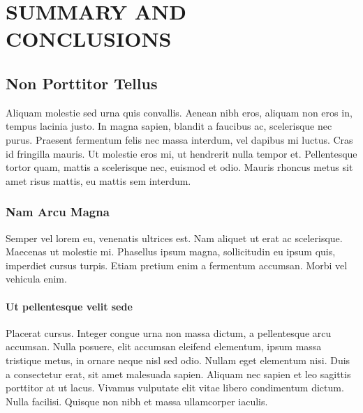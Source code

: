 \chapter{SUMMARY AND CONCLUSIONS} \label{conclusion}

\section{Non Porttitor Tellus}

Aliquam molestie sed urna quis convallis. Aenean nibh eros, aliquam non eros in, tempus lacinia justo. In magna sapien, blandit a faucibus ac, scelerisque nec purus. Praesent fermentum felis nec massa interdum, vel dapibus mi luctus. Cras id fringilla mauris. Ut molestie eros mi, ut hendrerit nulla tempor et. Pellentesque tortor quam, mattis a scelerisque nec, euismod et odio. Mauris rhoncus metus sit amet risus mattis, eu mattis sem interdum.

\subsection{Nam Arcu Magna}
Semper vel lorem eu, venenatis ultrices est. Nam aliquet ut erat ac scelerisque. Maecenas ut molestie mi. Phasellus ipsum magna, sollicitudin eu ipsum quis, imperdiet cursus turpis. Etiam pretium enim a fermentum accumsan. Morbi vel vehicula enim.

\subsubsection{Ut pellentesque velit sede}
 Placerat cursus. Integer congue urna non massa dictum, a pellentesque arcu accumsan. Nulla posuere, elit accumsan eleifend elementum, ipsum massa tristique metus, in ornare neque nisl sed odio. Nullam eget elementum nisi. Duis a consectetur erat, sit amet malesuada sapien. Aliquam nec sapien et leo sagittis porttitor at ut lacus. Vivamus vulputate elit vitae libero condimentum dictum. Nulla facilisi. Quisque non nibh et massa ullamcorper iaculis.

